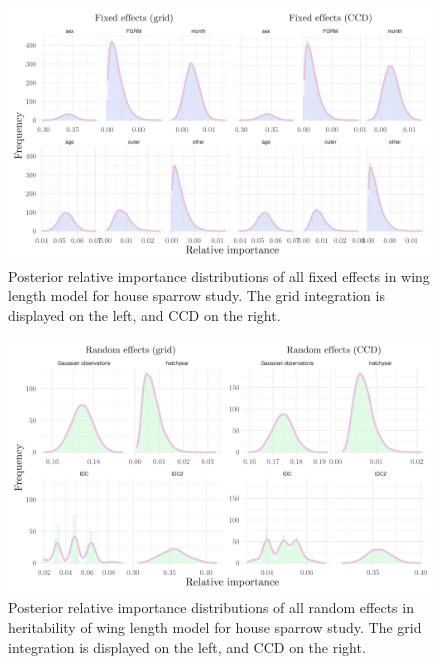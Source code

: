 \begin{figure}[H]%
  \centering
  \includegraphics[width=1\linewidth]{Figures/House sparrow study/Wing_fixed.png}
  \caption[Posterior relative importance distributions of all fixed effects in wing length model for house sparrow study]{Posterior relative importance distributions of all fixed effects in wing length model for house sparrow study. The grid integration is displayed on the left, and CCD on the right.}
  \label{fig:wing_fixed_sparrows}
\end{figure}

\begin{figure}[H]%
  \centering
  \includegraphics[width=1\linewidth]{Figures/House sparrow study/Wing_random.png}
  \caption[Posterior relative importance distributions of all random effects in wing length model for house sparrow study]{Posterior relative importance distributions of all random effects in heritability of wing length model for house sparrow study. The grid integration is displayed on the left, and CCD on the right.}
  \label{fig:wing_random_sparrows}
\end{figure}

